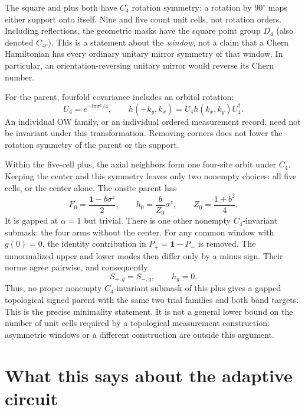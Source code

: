 \documentclass[aps,prb,onecolumn,nofootinbib,superscriptaddress]{revtex4-2}
\newcommand{\Id}{\mathbf{1}}
\newcommand{\ii}{\mathrm{i}}
\begin{document}
The square and plus both have $C_4$ rotation symmetry: a rotation by $90^\circ$ maps either support onto itself. Nine and five count unit cells, not rotation orders. Including reflections, the geometric masks have the square point group $D_4$ (also denoted $C_{4v}$). This is a statement about the \emph{window}, not a claim that a Chern Hamiltonian has every ordinary unitary mirror symmetry of that window. In particular, an orientation-reversing unitary mirror would reverse its Chern number.

For the parent, fourfold covariance includes an orbital rotation:
\begin{equation}
 U_4=e^{-\ii\pi\sigma^z/4},\qquad
 h(-k_y,k_x)=U_4h(k_x,k_y)U_4^\dagger.
\end{equation}
An individual OW family, or an individual ordered measurement record, need not be invariant under this transformation. Removing corners does not lower the rotation symmetry of the parent or the support.

Within the five-cell plus, the axial neighbors form one four-site orbit under $C_4$. Keeping the center and this symmetry leaves only two nonempty choices: all five cells, or the center alone. The onsite parent has
\begin{equation}
 F_0=\frac{\Id-b\sigma^z}{2},\qquad
 h_0=\frac{b}{Z_0}\sigma^z,\qquad Z_0=\frac{1+b^2}{4}.
\end{equation}
It is gapped at $\alpha=1$ but trivial. There is one other nonempty $C_4$-invariant submask: the four arms without the center. For any common window with $g(0)=0$, the identity contribution in $P_+=\Id-P_-$ is removed. The unnormalized upper and lower modes then differ only by a minus sign. Their norms agree pairwise, and consequently
\begin{equation}
 S_{+,g}=S_{-,g},\qquad h_g=0.
 \label{eq:nocenter}
\end{equation}
Thus, no proper nonempty $C_4$-invariant submask of this plus gives a gapped topological signed parent with the same two trial families and both band targets. This is the precise minimality statement. It is not a general lower bound on the number of unit cells required by a topological measurement construction: asymmetric windows or a different construction are outside this argument.

\section{What this says about the adaptive circuit}
\end{document}
